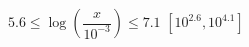 {$5.6 \leq \log\left(\dfrac{x}{10^{-3}}\right) \leq 7.1$ \label{sixfourRichterineq}}
{$\left[10^{2.6}, 10^{4.1}\right]$}